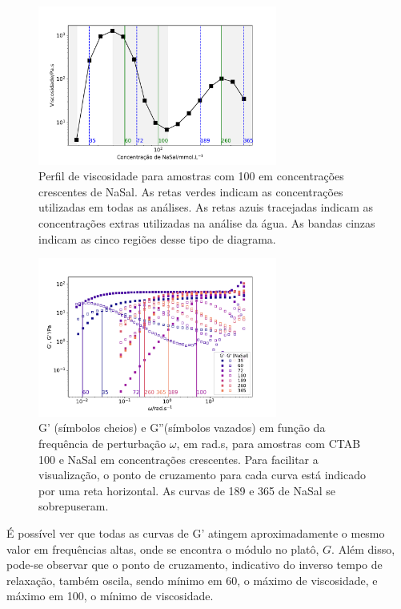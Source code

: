 		\begin{figure}[h]
			\centering
			\includegraphics[width=0.7\textwidth]{imagens/reologia/RH_agua_oscilatorio}
			\caption{Perfil de viscosidade para amostras com \CTAB{} 100 \mM{} em concentrações crescentes de NaSal. As retas verdes indicam as concentrações utilizadas em todas as análises. As retas azuis tracejadas indicam as concentrações extras utilizadas na análise da água. As bandas cinzas indicam as cinco regiões desse tipo de diagrama.}
			\label{fig:rh_agua_oscilatorio}
		\end{figure}
		
		\begin{figure}[h]
			\centering
			\includegraphics[width=0.7\textwidth]{imagens/reologia/oscilatorio_agua}
			\caption[Reogramas para água]{G' (símbolos cheios) e G''(símbolos vazados) em função da frequência de perturbação \(\omega\), em rad.s\menosUm, para amostras com CTAB 100\mM{} e NaSal em concentrações crescentes. Para facilitar a visualização, o ponto de cruzamento para cada curva está indicado por uma reta horizontal. As curvas de 189 e 365\mM{} de NaSal se sobrepuseram.}
			\label{fig:oscilatorio_agua}
		\end{figure}
		
		É possível ver que todas as curvas de G' atingem aproximadamente o mesmo valor em frequências altas, onde se encontra o módulo no platô, \(G\). Além disso, pode-se observar que o ponto de cruzamento, indicativo do inverso tempo de relaxação, também oscila, sendo mínimo em 60\mM, o máximo de viscosidade, e máximo em 100\mM, o mínimo de viscosidade. 
		
